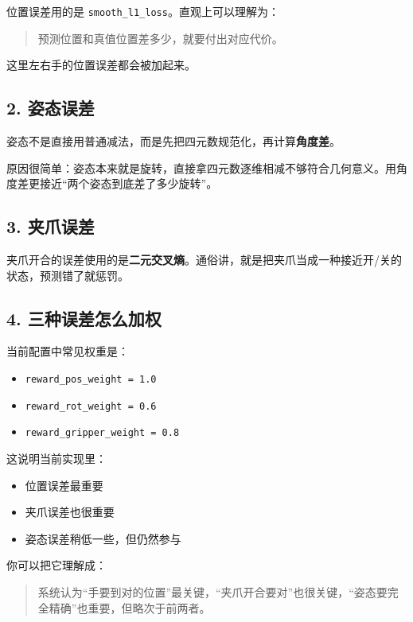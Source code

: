 \documentclass[12pt]{ctexart}
\begin{document}
位置误差用的是 \texttt{smooth\_l1\_loss}。直观上可以理解为：

\begin{quote}
    预测位置和真值位置差多少，就要付出对应代价。
\end{quote}

这里左右手的位置误差都会被加起来。

\subsection{2. 姿态误差}

姿态不是直接用普通减法，而是先把四元数规范化，再计算\textbf{角度差}。

原因很简单：姿态本来就是旋转，直接拿四元数逐维相减不够符合几何意义。用角度差更接近“两个姿态到底差了多少旋转”。

\subsection{3. 夹爪误差}

夹爪开合的误差使用的是\textbf{二元交叉熵}。通俗讲，就是把夹爪当成一种接近开/关的状态，预测错了就惩罚。

\subsection{4. 三种误差怎么加权}

当前配置中常见权重是：

\begin{itemize}
    \item \texttt{reward\_pos\_weight = 1.0}
    \item \texttt{reward\_rot\_weight = 0.6}
    \item \texttt{reward\_gripper\_weight = 0.8}
\end{itemize}

这说明当前实现里：

\begin{itemize}
    \item 位置误差最重要
    \item 夹爪误差也很重要
    \item 姿态误差稍低一些，但仍然参与
\end{itemize}

你可以把它理解成：

\begin{quote}
    系统认为“手要到对的位置”最关键，“夹爪开合要对”也很关键，“姿态要完全精确”也重要，但略次于前两者。
\end{quote}
\end{document}

